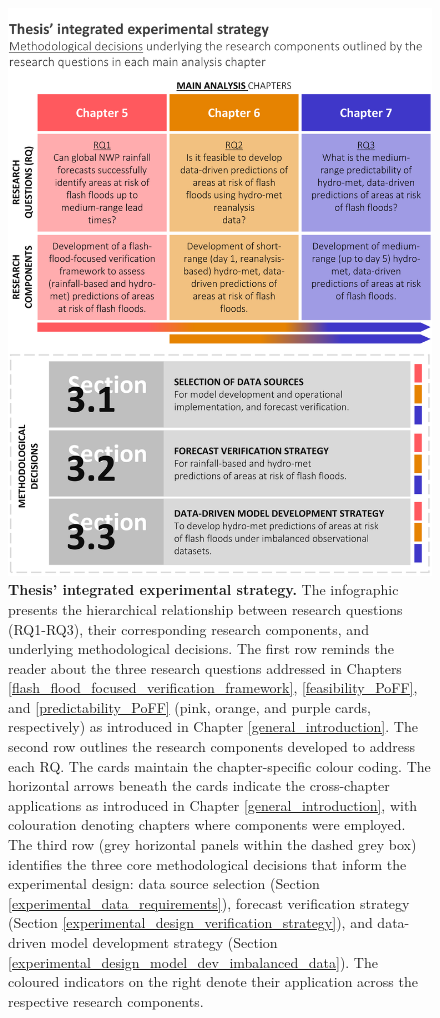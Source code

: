 \begin{figure}[htbp]
\centering
\includegraphics[width=\textwidth]{chapter_03/figures/integrated_experimental_strategy.png}
\caption{\textbf{Thesis' integrated experimental strategy.} The infographic presents the hierarchical relationship between research questions (RQ1-RQ3), their corresponding research components, and underlying methodological decisions. The first row reminds the reader about the three research questions addressed in Chapters \ref{flash_flood_focused_verification_framework}, \ref{feasibility_PoFF}, and \ref{predictability_PoFF} (pink, orange, and purple cards, respectively) as introduced in Chapter \ref{general_introduction}. The second row outlines the research components developed to address each RQ. The cards maintain the chapter-specific colour coding. The horizontal arrows beneath the cards indicate the cross-chapter applications as introduced in Chapter \ref{general_introduction}, with colouration denoting chapters where components were employed. The third row (grey horizontal panels within the dashed grey box) identifies the three core methodological decisions that inform the experimental design: data source selection (Section \ref{experimental_data_requirements}), forecast verification strategy (Section \ref{experimental_design_verification_strategy}), and data-driven model development strategy (Section \ref{experimental_design_model_dev_imbalanced_data}). The coloured indicators on the right denote their application across the respective research components.}
\label{fig:integrated_experimental_strategy}
\end{figure}

